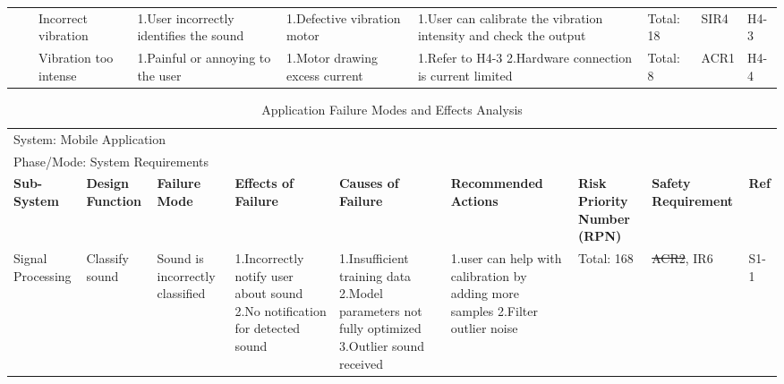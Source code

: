 \documentclass[12pt, titlepage]{article}
\begin{document}
\begin{landscape}
\begin{table}[H]
\begin{tabular}{| p{} | p{}  | p{} | p{} | p{} | p{} | p{} | p{} | p{} |}
         & & Incorrect vibration & 1.User incorrectly identifies the sound & 1.Defective vibration motor & 1.User can calibrate the vibration intensity and check the output  & Total: 18 & SIR4 & H4-3 \\ \cline{3-9}
     
         & & Vibration too intense & 1.Painful or annoying to the user & 1.Motor drawing excess current & 1.Refer to H4-3 \newline 2.Hardware connection is current limited & Total: 8 & ACR1 & H4-4 \\ \hline
     
        \end{tabular}
        \hspace*{-1cm}
\end{table}

\begin{table}[H]

    \caption{Application Failure Modes and Effects Analysis}
    \centering
    \begin{tabular}{| p{} | p{}  | p{} | p{} | p{} | p{} | p{} | p{} | p{} |}
     \hline
    
    \multicolumn{9}{|l|}{System: Mobile Application } \\
    \multicolumn{9}{|l|}{Phase/Mode: System Requirements} \\ \hline
    \textbf{Sub-System} & \textbf{Design Function} & \textbf{Failure Mode} & \textbf{Effects of Failure} & \textbf{Causes of Failure} & \textbf{Recommended Actions} & \textbf{Risk Priority Number (RPN)} & \textbf{Safety Requirement} & \textbf{Ref} \\ \hline

    Signal Processing & Classify sound & Sound is incorrectly classified & 1.Incorrectly notify user about sound \newline 2.No notification for detected sound & 1.Insufficient training data \newline 2.Model parameters not fully optimized \newline 3.Outlier sound received  & 1.user can help with calibration by adding more samples \newline 2.Filter outlier noise  & Total: 168 & \sout{ACR2}, IR6 & S1-1 \\ \cline{3-9}
    

\end{tabular}
\end{table}
\end{landscape}
\end{document}
